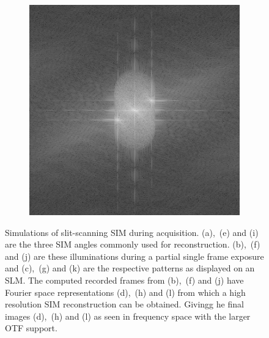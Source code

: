\begin{figure}[ht!]
\begin{subfigure}[t]{0.23\textwidth}
        \caption{}
    \end{subfigure}\hfill
    \begin{subfigure}[t]{0.23\textwidth}
        \centering
        \includegraphics[width=\textwidth]{sim_slit/3/fft}
        \caption{}
    \end{subfigure}
  \caption[Simulations of slit-scanning \gls{SIM} during acquisition]{
  Simulations of slit-scanning \gls{SIM} during acquisition.
  (a),~(e) and (i) are the three \gls{SIM} angles commonly used for reconstruction.
  (b),~(f) and (j) are these illuminations during a partial single frame exposure and
  (c),~(g) and (k) are the respective patterns as displayed on an \gls{SLM}.
  The computed recorded frames from (b),~(f) and (j) have Fourier space representations (d),~(h) and (l) from which a high resolution \gls{SIM} reconstruction can be obtained.
  Givingg he final images (d),~(h) and (l) as seen in frequency space with the larger \gls{OTF} support.
  }\label{fig:sim_slit}
\end{figure}
